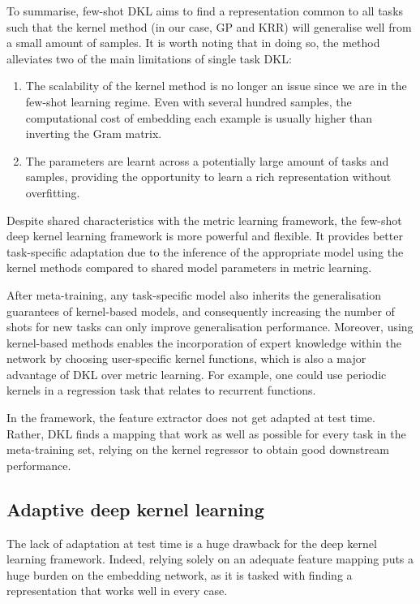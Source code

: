 \documentclass[11pt]{article}
\numberwithin{equation}{subsection}
\begin{document}
To summarise, few-shot DKL aims to find a representation common to all tasks such that the kernel method (in our case, GP and KRR) will generalise well from a small amount of samples. It is worth noting that in doing so, the method alleviates two of the main limitations of single task DKL:
\begin{enumerate}
  \item The scalability of the kernel method is no longer an issue since we are in the few-shot learning regime. Even with several hundred samples, the computational cost of embedding each example is usually higher than inverting the Gram matrix.
  \item The parameters are learnt across a potentially large amount of tasks and samples, providing the opportunity to learn a rich representation without overfitting.
\end{enumerate}

Despite shared characteristics with the metric learning framework, the few-shot deep kernel learning framework is more powerful and flexible.
It provides better task-specific adaptation due to the inference of the appropriate model using the kernel methods compared to shared model parameters in metric learning.

After meta-training, any task-specific model also inherits the generalisation guarantees of kernel-based models, and consequently increasing the number of shots for new tasks can only improve generalisation performance. Moreover, using kernel-based methods enables the incorporation of expert knowledge within the network by choosing user-specific kernel functions, which is also a major advantage of DKL over metric learning. For example, one could use periodic kernels in a regression task that relates to recurrent functions.

In the framework, the feature extractor does not get adapted at test time. Rather, DKL finds a mapping that work as well as possible for every task in the meta-training set, relying on the kernel regressor to obtain good downstream performance.


\subsection{Adaptive deep kernel learning}

The lack of adaptation at test time is a huge drawback for the deep kernel learning framework. Indeed, relying solely on an adequate feature mapping puts a huge burden on the embedding network, as it is tasked with finding a representation that works well in every case.
\end{document}
